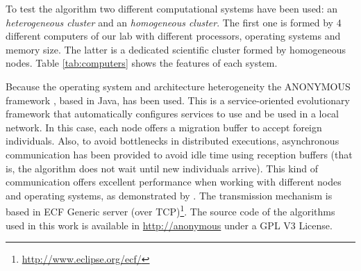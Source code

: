 To test the algorithm two different computational systems have been used: an {\em heterogeneous cluster} and an {\em homogeneous cluster}. The first one is formed by 4 different computers of our lab with different processors, operating systems and memory size. The latter is a dedicated scientific cluster formed by homogeneous nodes. Table \ref{tab:computers} shows the features of each system.

\begin{table*}
\label{tab:computers}
\end{table*}

Because the operating system and architecture heterogeneity the ANONYMOUS framework \cite{OSGILIATH}, based in Java, has been used. This is a service-oriented evolutionary framework that automatically configures services to use and be used in a local network. In this case, each node offers a migration buffer to accept foreign individuals. Also, to avoid bottlenecks in distributed executions, asynchronous communication has been provided to avoid idle time using reception buffers (that is, the algorithm does not wait until new individuals arrive). This kind of communication offers excellent performance when working with different nodes and operating systems, as demonstrated by \cite{HETEROGENEOUSHARD}. The transmission mechanism is based in ECF Generic server (over TCP)\footnote{\url{http://www.eclipse.org/ecf/}}. The source code of the algorithms used in this work is available in \url{http://anonymous} under a GPL V3 License.


